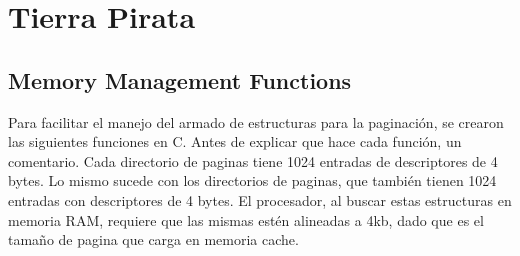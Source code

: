 \section{Tierra Pirata}

\subsection{Memory Management Functions}
Para facilitar el manejo del armado de estructuras para la paginación, se crearon las siguientes funciones en C. Antes de explicar que hace cada función, un comentario. Cada directorio de paginas tiene 1024 entradas de descriptores de 4 bytes. Lo mismo sucede con los directorios de paginas, que también tienen 1024 entradas con descriptores de 4 bytes. El procesador, al buscar estas estructuras en memoria RAM, requiere que las mismas estén alineadas a 4kb, dado que es el tamaño de pagina que carga en memoria cache.

